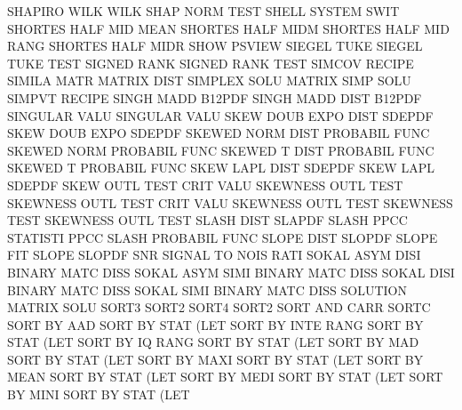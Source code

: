 SHAPIRO  WILK                           WILK     SHAP NORM TEST
SHELL                                   SYSTEM   SWIT
SHORTES  HALF MID  MEAN                 SHORTES  HALF MIDM
SHORTES  HALF MID  RANG                 SHORTES  HALF MIDR
SHOW                                    PSVIEW
SIEGEL   TUKE                           SIEGEL   TUKE TEST
SIGNED   RANK                           SIGNED   RANK TEST
SIMCOV                                  RECIPE
SIMILA   MATR                           MATRIX   DIST
SIMPLEX  SOLU                           MATRIX   SIMP SOLU
SIMPVT                                  RECIPE
SINGH    MADD                           B12PDF
SINGH    MADD DIST                      B12PDF
SINGULAR VALU                           SINGULAR VALU
SKEW     DOUB EXPO DIST                 SDEPDF
SKEW     DOUB EXPO                      SDEPDF
SKEWED   NORM DIST                      PROBABIL FUNC
SKEWED   NORM                           PROBABIL FUNC
SKEWED   T    DIST                      PROBABIL FUNC
SKEWED   T                              PROBABIL FUNC
SKEW     LAPL DIST                      SDEPDF
SKEW     LAPL                           SDEPDF
SKEW     OUTL TEST CRIT VALU            SKEWNESS OUTL TEST
SKEWNESS OUTL TEST CRIT VALU            SKEWNESS OUTL TEST
SKEWNESS TEST                           SKEWNESS OUTL TEST
SLASH    DIST                           SLAPDF
SLASH    PPCC                           STATISTI PPCC
SLASH                                   PROBABIL FUNC
SLOPE    DIST                           SLOPDF
SLOPE                                   FIT
SLOPE                                   SLOPDF
SNR                                     SIGNAL   TO   NOIS RATI
SOKAL    ASYM DISI                      BINARY   MATC DISS
SOKAL    ASYM SIMI                      BINARY   MATC DISS
SOKAL    DISI                           BINARY   MATC DISS
SOKAL    SIMI                           BINARY   MATC DISS
SOLUTION                                MATRIX   SOLU
SORT3                                   SORT2
SORT4                                   SORT2
SORT     AND  CARR                      SORTC
SORT     BY   AAD                       SORT     BY   STAT (LET
SORT     BY   INTE RANG                 SORT     BY   STAT (LET
SORT     BY   IQ   RANG                 SORT     BY   STAT (LET
SORT     BY   MAD                       SORT     BY   STAT (LET
SORT     BY   MAXI                      SORT     BY   STAT (LET
SORT     BY   MEAN                      SORT     BY   STAT (LET
SORT     BY   MEDI                      SORT     BY   STAT (LET
SORT     BY   MINI                      SORT     BY   STAT (LET
